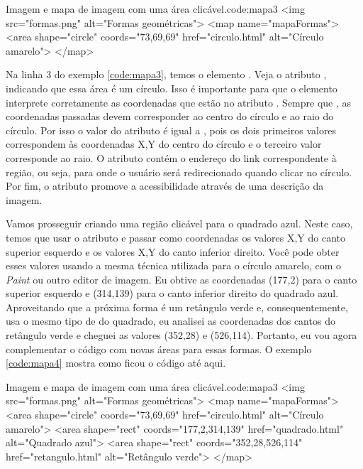 \begin{htmlcode}{Imagem e mapa de imagem com uma área clicável.}{code:mapa3}
<img src="formas.png" alt="Formas geométricas">
<map name="mapaFormas">
    <area shape="circle" coords="73,69,69" href="circulo.html" alt="Círculo amarelo">
</map>
\end{htmlcode}

Na linha 3 do exemplo \ref{code:mapa3}, temos o elemento . Veja o atributo , indicando que essa área é um círculo. Isso é importante para que o elemento interprete corretamente as coordenadas que estão no atributo . Sempre que , as coordenadas passadas devem corresponder ao centro do círculo e ao raio do círculo. Por isso o valor do atributo  é igual a , pois os dois primeiros valores correspondem às coordenadas X,Y do centro do círculo e o terceiro valor corresponde ao raio. O atributo  contém o endereço do link correspondente à região, ou seja, para onde o usuário será redirecionado quando clicar no círculo. Por fim, o atributo  promove a acessibilidade através de uma descrição da imagem.

Vamos prosseguir criando uma região clicável para o quadrado azul. Neste caso, temos que usar o atributo  e passar como coordenadas os valores X,Y do canto superior esquerdo e os valores X,Y do canto inferior direito. Você pode obter esses valores usando a mesma técnica utilizada para o círculo amarelo, com o \textit{Paint} ou outro editor de imagem. Eu obtive as coordenadas (177,2) para o canto superior esquerdo e (314,139) para o canto inferior direito do quadrado azul. Aproveitando que a próxima forma é um retângulo verde e, consequentemente, usa o mesmo tipo de  do quadrado, eu analisei as coordenadas dos cantos do retângulo verde e cheguei as valores (352,28) e (526,114). Portanto, eu vou agora complementar o código com novas áreas para essas formas. O exemplo \ref{code:mapa4} mostra como ficou o código até aqui.

\begin{htmlcode}{Imagem e mapa de imagem com uma área clicável.}{code:mapa3}
<img src="formas.png" alt="Formas geométricas">
<map name="mapaFormas">
    <area shape="circle" coords="73,69,69" href="circulo.html" alt="Círculo amarelo">
    <area shape="rect" coords="177,2,314,139" href="quadrado.html" alt="Quadrado azul">
    <area shape="rect" coords="352,28,526,114" href="retangulo.html" alt="Retângulo verde">
</map>
\end{htmlcode}

